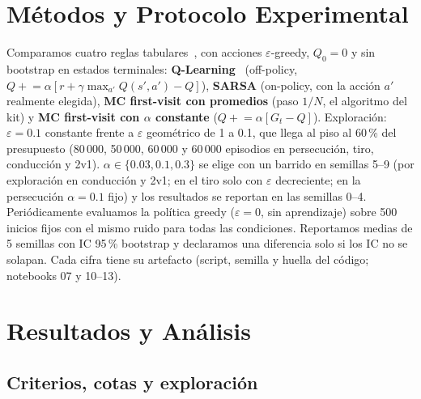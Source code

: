 \documentclass[11pt,a4paper]{article}
\begin{document}
\section{Métodos y Protocolo Experimental}

Comparamos cuatro reglas tabulares~\cite{sutton}, con acciones $\varepsilon$-greedy, $Q_0 = 0$ y sin bootstrap en
estados terminales: \textbf{Q-Learning}~\cite{watkins1992} (off-policy, $Q \mathrel{+}= \alpha[r + \gamma
\max_{a'} Q(s',a') - Q]$), \textbf{SARSA} (on-policy, con la acción $a'$ realmente elegida), \textbf{MC first-visit
con promedios} (paso $1/N$, el algoritmo del kit) y \textbf{MC first-visit con $\alpha$ constante}
($Q \mathrel{+}= \alpha[G_t - Q]$). Exploración: $\varepsilon = 0.1$ constante frente a $\varepsilon$ geométrico de 1
a 0.1, que llega al piso al 60\,\% del presupuesto (80\,000, 50\,000, 60\,000 y 60\,000 episodios en persecución,
tiro, conducción y 2v1). $\alpha \in \{0.03, 0.1, 0.3\}$ se elige con un barrido en semillas 5--9 (por exploración en
conducción y 2v1; en el tiro solo con $\varepsilon$ decreciente; en la persecución $\alpha = 0.1$ fijo) y los
resultados se reportan en las semillas 0--4. Periódicamente evaluamos la política greedy ($\varepsilon = 0$, sin
aprendizaje) sobre 500 inicios fijos con el mismo ruido para todas las condiciones. Reportamos medias de 5 semillas
con IC 95\,\% bootstrap y declaramos una diferencia solo si los IC no se solapan. Cada cifra tiene su artefacto
(script, semilla y huella del código; notebooks 07 y 10--13).

\section{Resultados y Análisis}

\subsection{Criterios, cotas y exploración}
\end{document}
